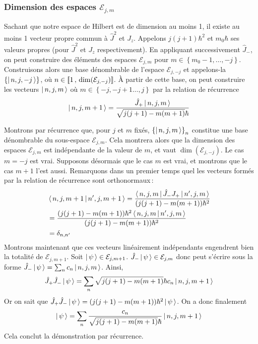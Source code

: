 \subsubsection{Dimension des espaces $\mathcal{E}_{j,m}$}

Sachant que notre espace de Hilbert est de dimension au moins 1, il existe au moins 1 vecteur propre commun à $\hat{J}^2$ et $J_z$. Appelons $j(j+1)\hbar^2$ et $m_0 \hbar$ ses valeurs propres (pour $\hat{J}^2$ et $J_z$ respectivement). En appliquant successivement $\hat{J}_-$, on peut construire des éléments des espaces $\mathcal{E}_{j,m}$ pour $m \in \left\{m_0 - 1, \ldots, -j\right\}$. Construisons alors une base dénombrable de l’espace $\mathcal{E}_{j, -j}$ et appelons-la $\left\{\left| \, n, j, -j \, \right>\right\}$, où $n \in \left[\!\left[ 1 \, , \, \dim(\mathcal{E}_{j,-j}) \right]\!\right]$. À partir de cette base, on peut construire les vecteurs $\left| \, n,j,m \, \right>$ où $m \in \left\{-j, -j + 1 \ldots, j\right\}$ par la relation de récurrence
\[ \left| \, n, j, m+1 \, \right> = \frac{\hat{J}_+ \left| \, n,j,m \, \right>}{\sqrt{j(j+1) - m(m+1)} \hbar} \]

Montrons par récurrence que, pour $j$ et $m$ fixés, $\left\{\left| \, n,j,m \, \right>\right\}_n$ constitue une base dénombrable du sous-espace $\mathcal{E}_{j,m}$. Cela montrera alors que la dimension des espaces $\mathcal{E}_{j,m}$ est indépendante de la valeur de $m$, et vaut $\dim(\mathcal{E}_{j,-j})$. Le cas $m = -j$ est vrai. Supposons désormais que le cas $m$ est vrai, et montrons que le cas $m+1$ l’est aussi. Remarquons dans un premier temps quel les vecteurs formés par la relation de récurrence sont orthonormaux :
\begin{align*}
     & \left< \, n,j,m+1 \, \middle| \, n',j,m+1 \, \right> = \frac{\left< \, n,j,m \, \right| \hat{J}_- J_+ \left| \, n',j,m \, \right>}{(j(j+1) - m(m+1))\hbar^2} \\
     & = \frac{(j(j+1) - m(m+1))\hbar^2 \left< \, n,j,m \, \middle| \, n',j,m \, \right>}{(j(j+1) - m(m+1))\hbar^2}                   \\
     & = \delta_{n,n'}
\end{align*}
Montrons maintenant que ces vecteurs linéairement indépendants engendrent bien la totalité de $\mathcal{E}_{j, m+1}$. Soit $\left| \, \psi \, \right> \in \mathcal{E}_{j, m+ 1}$. $\hat{J}_{-}\left| \, \psi \, \right> \in \mathcal{E}_{j,m}$ donc peut s’écrire sous la forme $\hat{J}_- \left| \, \psi \, \right> = \sum_n c_n \left| \, n,j,m \, \right>$. Ainsi,
\[
    \hat{J}_+ \hat{J}_- \left| \, \psi \, \right> = \sum_{n} \sqrt{j(j+1) - m(m+1)} \hbar c_n \left| \, n,j, m+1 \, \right>
\]
Or on sait que $\hat{J}_+ \hat{J}_- \left| \, \psi \, \right> = (j(j+1) - m(m+1)) \hbar^2 \left| \, \psi \, \right>$. On a donc finalement
\[ \left| \, \psi \, \right> = \sum_n \frac{c_n}{\sqrt{j(j+1) - m(m+1)}\hbar} \left| \, n, j, m+1 \, \right> \]
Cela conclut la démonstration par récurrence.

